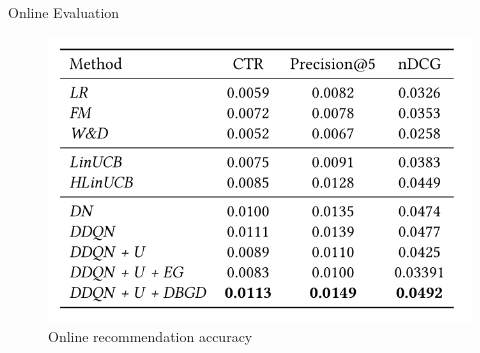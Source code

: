 \begin{frame}{Online Evaluation}
\begin{figure}
    \centering
    \includegraphics[scale=0.5]{PPT/DeepinScreenshot_select-area_20200519134538.png}
    \caption{Online recommendation accuracy}
    \label{fig:online_acc}
\end{figure}
\end{frame}